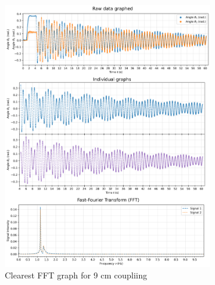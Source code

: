 \documentclass[12pt]{article}
\begin{document}
\begin{figure}[H] %
    \centering
    \begin{subfigure}{0.49\linewidth}
        \centering
        \includegraphics[width=0.98\linewidth]{figs/beat (left_9_3)_cropped.png}
        \caption{Clearest FFT graph for 9 cm coupliing}
    \end{subfigure}
    \begin{subfigure}{0.49\linewidth}
        \centering

\end{subfigure}
\end{figure}
\end{document}
